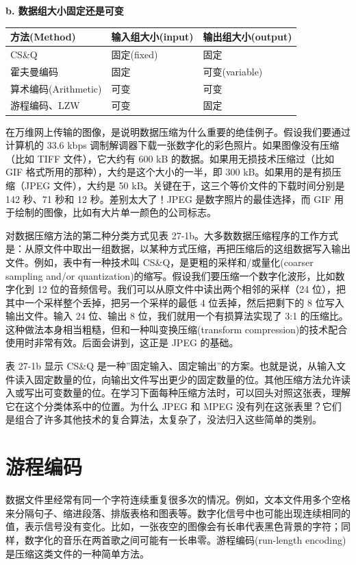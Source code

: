 \textbf{b. 数据组大小固定还是可变}

{\def\LTcaptype{none} %
\begin{longtable}[]{@{}lll@{}}
\toprule\noalign{}
方法(Method) & 输入组大小(input) & 输出组大小(output) \\
\midrule\noalign{}
\endhead
\bottomrule\noalign{}
\endlastfoot
CS\&Q & 固定(fixed) & 固定 \\
霍夫曼编码 & 固定 & 可变(variable) \\
算术编码(Arithmetic) & 可变 & 可变 \\
游程编码、LZW & 可变 & 固定 \\
\end{longtable}
}

在万维网上传输的图像，是说明数据压缩为什么重要的绝佳例子。假设我们要通过计算机的
33.6 kbps 调制解调器下载一张数字化的彩色照片。如果图像没有压缩（比如
TIFF 文件），它大约有 600 kB 的数据。如果用无损技术压缩过（比如 GIF
格式所用的那种），大约是这个大小的一半，即 300
kB。如果用的是有损压缩（JPEG 文件），大约是 50
kB。关键在于，这三个等价文件的下载时间分别是 142 秒、71 秒和 12
秒。差别太大了！JPEG 是数字照片的最佳选择，而 GIF
用于绘制的图像，比如有大片单一颜色的公司标志。

对数据压缩方法的第二种分类方式见表
27-1b。大多数数据压缩程序的工作方式是：从原文件中取出一组数据，以某种方式压缩，再把压缩后的这组数据写入输出文件。例如，表中有一种技术叫
CS\&Q，是更粗的采样和/或量化(coarser sampling and/or
quantization)的缩写。假设我们要压缩一个数字化波形，比如数字化到 12
位的音频信号。我们可以从原文件中读出两个相邻的采样（24
位），把其中一个采样整个丢掉，把另一个采样的最低 4 位丢掉，然后把剩下的
8 位写入输出文件。输入 24 位、输出 8 位，我们就用一个有损算法实现了 3:1
的压缩比。这种做法本身相当粗糙，但和一种叫变换压缩(transform
compression)的技术配合使用时非常有效。后面会讲到，这正是 JPEG 的基础。

表 27-1b 显示 CS\&Q
是一种''固定输入、固定输出''的方案。也就是说，从输入文件读入固定数量的位，向输出文件写出更少的固定数量的位。其他压缩方法允许读入或写出可变数量的位。在学习下面每种压缩方法时，可以回头对照这张表，理解它在这个分类体系中的位置。为什么
JPEG 和 MPEG
没有列在这张表里？它们是组合了许多其他技术的复合算法，太复杂了，没法归入这些简单的类别。

\section{游程编码}

数据文件里经常有同一个字符连续重复很多次的情况。例如，文本文件用多个空格来分隔句子、缩进段落、排版表格和图表等。数字化信号中也可能出现连续相同的值，表示信号没有变化。比如，一张夜空的图像会有长串代表黑色背景的字符；同样，数字化的音乐在两首歌之间可能有一长串零。游程编码(run-length
encoding)是压缩这类文件的一种简单方法。

